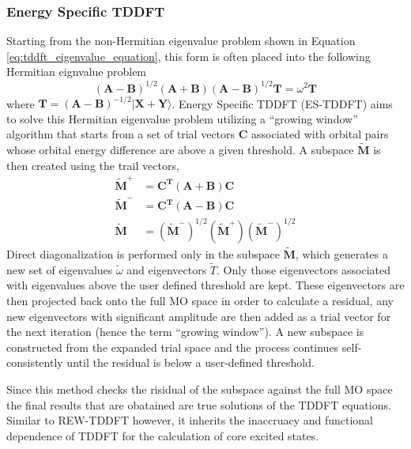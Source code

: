 \documentclass[final]{emory}
\begin{document}
\subsubsection{Energy Specific TDDFT}
Starting from the non-Hermitian eigenvalue problem shown in Equation \ref{eq:tddft_eigenvalue_equation}, this form is often placed into the following Hermitian eignvalue problem
\begin{equation}
(\mathbf{A} - \mathbf{B})^{1/2} (\mathbf{A} +\mathbf{B}) (\mathbf{A} - \mathbf{B})^{1/2} \mathbf{T} = \omega^2 \mathbf{T}
\end{equation}
where $\mathbf{T} = (\mathbf{A} - \mathbf{B})^{-1/2} |\mathbf{X} + \mathbf{Y} \rangle$. Energy Specific TDDFT (ES-TDDFT) aims to solve this Hermitian eigenvalue problem utilizing a ``growing window'' algorithm that starts from a set of trial vectors $\mathbf{C}$ associated with orbital pairs whose orbital energy difference are above a given threshold. A subspace $\mathbf{\tilde{M}}$ is then created using the trail vectors,
\begin{align}
\mathbf{\tilde{M}}^+ &= \mathbf{C^T} (\mathbf{A} +\mathbf{B})\mathbf{C} \\
\mathbf{\tilde{M}}^- &= \mathbf{C^T} (\mathbf{A} -\mathbf{B})\mathbf{C} \\
\mathbf{\tilde{M}} &= (\mathbf{\tilde{M}} ^-)^{1/2} (\mathbf{\tilde{M}} ^+) (\mathbf{\tilde{M}}^-)^{1/2}
\end{align}
Direct diagonalization is performed only in the subspace $\mathbf{\tilde{M}}$, which generates a new set of eigenvalues $\tilde{\omega}$ and eigenvectors $\tilde{T}$. Only those eigenvectors associated with eigenvalues above the user defined threshold are kept. These eigenvectors are then projected back onto the full MO space in order to calculate a residual, any new eigenvectors with significant amplitude are then added as a trial vector for the next iteration (hence the term ``growing window''). A new subspace is constructed from the expanded trial space and the process continues self-consistently until the residual is below a user-defined threshold.

Since this method checks the risidual of the subspace against the full MO space the final results that are obatained are true solutions of the TDDFT equations. Similar to REW-TDDFT however, it inherits the inaccruacy and functional dependence of TDDFT for the calculation of core excited states.
\end{document}
